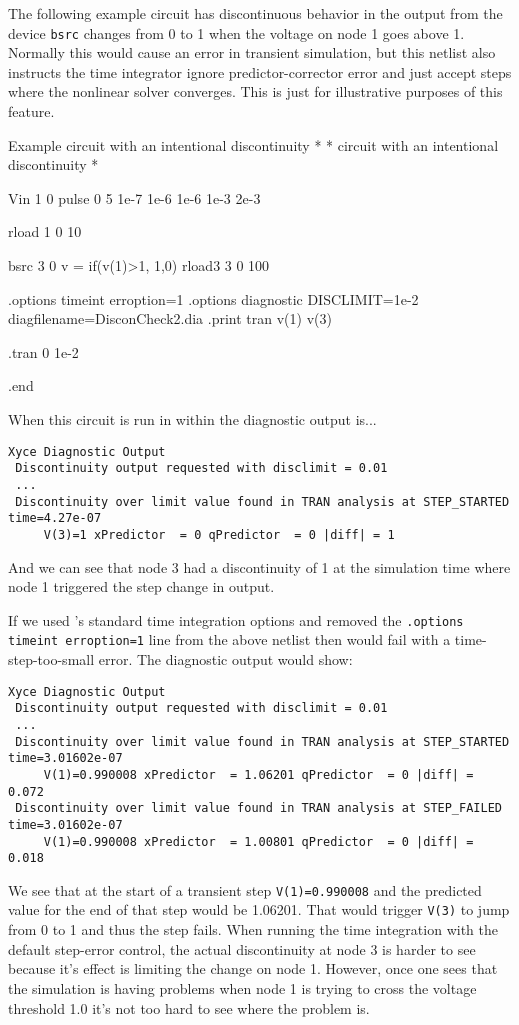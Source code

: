 The following example circuit has discontinuous behavior in the output from 
the device \texttt{bsrc} changes from 0 to 1 when the voltage on node 1 goes 
above 1.  Normally this would cause an error in transient simulation, but this netlist
also instructs the time integrator ignore predictor-corrector error and just 
accept steps where the nonlinear solver converges.  This is just for illustrative 
purposes of this feature.  

\begin{NetlistFigure}{Example circuit with an intentional discontinuity}
*
* circuit with an intentional discontinuity 
*

Vin 1 0 pulse 0 5 1e-7 1e-6 1e-6 1e-3 2e-3

rload 1 0 10


bsrc 3 0 v = {if(v(1)>1, 1,0)}
rload3 3 0 100


.options timeint erroption=1
.options diagnostic DISCLIMIT=1e-2 diagfilename=DisconCheck2.dia
.print tran v(1) v(3)

.tran 0 1e-2

.end

\end{NetlistFigure}

When this circuit is run in \Xyce{} within the diagnostic output is...
\begin{verbatim}
Xyce Diagnostic Output
 Discontinuity output requested with disclimit = 0.01
 ...
 Discontinuity over limit value found in TRAN analysis at STEP_STARTED time=4.27e-07
     V(3)=1 xPredictor  = 0 qPredictor  = 0 |diff| = 1
\end{verbatim}

And we can see that node 3 had a discontinuity of 1 at the simulation time where
node 1 triggered the step change in output.

If we used \Xyce{}'s standard time integration options and removed the \texttt{.options timeint erroption=1}
line from the above netlist then \Xyce{} would fail with a time-step-too-small error.  The
diagnostic output would show:



\begin{verbatim}
Xyce Diagnostic Output
 Discontinuity output requested with disclimit = 0.01
 ...
 Discontinuity over limit value found in TRAN analysis at STEP_STARTED time=3.01602e-07
     V(1)=0.990008 xPredictor  = 1.06201 qPredictor  = 0 |diff| = 0.072
 Discontinuity over limit value found in TRAN analysis at STEP_FAILED time=3.01602e-07
     V(1)=0.990008 xPredictor  = 1.00801 qPredictor  = 0 |diff| = 0.018
\end{verbatim}
We see that at the start of a transient step \texttt{V(1)=0.990008} and the predicted 
value for the end of that step would be 1.06201.  That would trigger \texttt{V(3)} to jump
from 0 to 1 and thus the step fails.  When running the time integration with the default 
step-error control, the actual discontinuity at node 3 is harder to see because it's effect
is limiting the change on node 1.  However, once one sees that the simulation is having 
problems when node 1 is trying to cross the voltage threshold 1.0 it's not too hard to see
where the problem is. 

